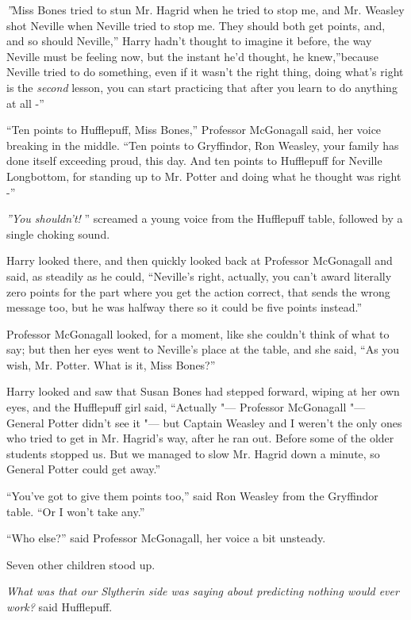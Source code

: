 \emph{''}Miss Bones tried to stun Mr. Hagrid when he tried to stop me,
and Mr. Weasley shot Neville when Neville tried to stop me. They should
both get points, and, and so should Neville,'' Harry hadn't thought to
imagine it before, the way Neville must be feeling now, but the instant
he'd thought, he knew,''because Neville tried to do something, even if
it wasn't the right thing, doing what's right is the \emph{second}
lesson, you can start practicing that after you learn to do anything at
all -''

``Ten points to Hufflepuff, Miss Bones,'' Professor McGonagall said, her
voice breaking in the middle. ``Ten points to Gryffindor, Ron Weasley,
your family has done itself exceeding proud, this day. And ten points to
Hufflepuff for Neville Longbottom, for standing up to Mr. Potter and
doing what he thought was right -''

\emph{''You shouldn't!} '' screamed a young voice from the Hufflepuff
table, followed by a single choking sound.

Harry looked there, and then quickly looked back at Professor McGonagall
and said, as steadily as he could, ``Neville's right, actually, you
can't award literally zero points for the part where you get the action
correct, that sends the wrong message too, but he was halfway there so
it could be five points instead.''

Professor McGonagall looked, for a moment, like she couldn't think of
what to say; but then her eyes went to Neville's place at the table, and
she said, ``As you wish, Mr. Potter. What is it, Miss Bones?''

Harry looked and saw that Susan Bones had stepped forward, wiping at her
own eyes, and the Hufflepuff girl said, ``Actually "--- Professor
McGonagall "--- General Potter didn't see it "--- but Captain Weasley and I
weren't the only ones who tried to get in Mr. Hagrid's way, after he ran
out. Before some of the older students stopped us. But we managed to
slow Mr. Hagrid down a minute, so General Potter could get away.''

``You've got to give them points too,'' said Ron Weasley from the
Gryffindor table. ``Or I won't take any.''

``Who else?'' said Professor McGonagall, her voice a bit unsteady.

Seven other children stood up.

\emph{What was that our Slytherin side was saying about predicting
nothing would ever work?} said Hufflepuff.

